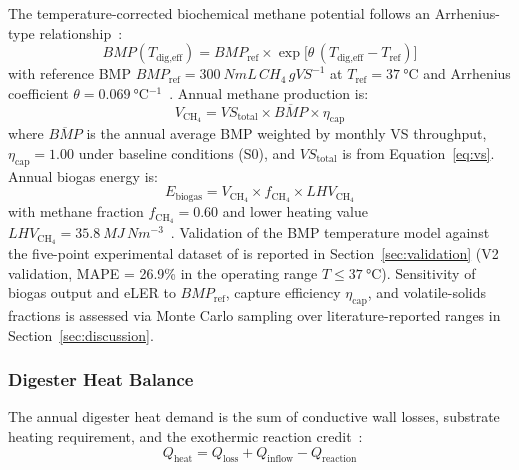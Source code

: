 \hspace{1cm}The temperature-corrected biochemical methane potential
follows an Arrhenius-type relationship~\citep{pilarski2025, feng2013}:
\begin{equation}
	BMP(T_{\text{dig,eff}}) = BMP_{\text{ref}} \times
	\exp\!\bigl[\theta\,
	(T_{\text{dig,eff}} - T_{\text{ref}})\bigr]
	\label{eq:bmp}
\end{equation}
with reference BMP $BMP_{\text{ref}} = \SI{300}{NmL\,CH_4\,gVS^{-1}}$
at $T_{\text{ref}} = \SI{37}{\celsius}$ and Arrhenius coefficient
$\theta = \SI{0.069}{\celsius^{-1}}$~\citep{pilarski2025}. Annual
methane production is:
\begin{equation}
	V_{\text{CH}_4} = VS_{\text{total}} \times
	\overline{BMP} \times \eta_{\text{cap}}
	\label{eq:ch4vol}
\end{equation}
where $\overline{BMP}$ is the annual average BMP weighted by monthly
VS throughput, $\eta_{\text{cap}} = 1.00$ under baseline conditions
(S0), and $VS_{\text{total}}$ is from Equation~\ref{eq:vs}.
Annual biogas energy is:
\begin{equation}
	E_{\text{biogas}} = V_{\text{CH}_4} \times
	f_{\text{CH}_4} \times LHV_{\text{CH}_4}
	\label{eq:ebiogas}
\end{equation}
with methane fraction $f_{\text{CH}_4} = 0.60$ and lower heating
value $LHV_{\text{CH}_4} = \SI{35.8}{MJ\,Nm^{-3}}$~\citep{marchaim1992}.
Validation of the BMP temperature model against the five-point
experimental dataset of \citet{feng2013} is reported in
Section~\ref{sec:validation} (V2 validation,
MAPE = 26.9\% in the operating range $T \leq \SI{37}{\celsius}$).
Sensitivity of biogas output and eLER to $BMP_{\text{ref}}$,
capture efficiency $\eta_{\text{cap}}$, and volatile-solids
fractions is assessed via Monte Carlo sampling over
literature-reported ranges in Section~\ref{sec:discussion}.

\subsubsection{Digester Heat Balance}

\hspace{1cm}The annual digester heat demand is the sum of conductive
wall losses, substrate heating requirement, and the exothermic
reaction credit~\citep{pal2024}:
\begin{equation}
	Q_{\text{heat}} = Q_{\text{loss}} + Q_{\text{inflow}}
	- Q_{\text{reaction}}
	\label{eq:qheat}
\end{equation}

